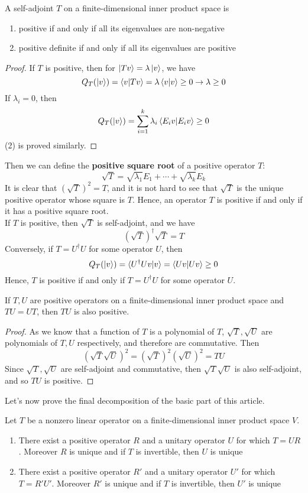 \documentclass{article}
\begin{document}
\begin{thm}
	A self-adjoint $T$ on a finite-dimensional inner product space is
	\begin{enumerate}
		\item positive if and only if all its eigenvalues are non-negative
		\item positive definite if and only if all its eigenvalues are positive
	\end{enumerate}
\end{thm}
\begin{proof}
	If $T$ is positive, then for $\ket{Tv}=\lambda\ket{v}$, we have
	\[Q_T(\ket{v})=\braket{v|Tv}=\lambda\braket{v|v}\ge0\rightarrow\lambda\ge0\]
	If $\lambda_i=0$, then
	\[Q_T(\ket{v})=\sum_{i=1}^k\lambda_i\braket{E_iv|E_iv}\ge0\]
	(2) is proved similarly.
\end{proof}
Then we can define the \textbf{positive square root} of a positive operator $T$:
\[\sqrt{T}=\sqrt{\lambda_1}E_1+\cdots+\sqrt{\lambda_k}E_k\]
It is clear that $(\sqrt{T})^2=T$, and it is not hard to see that $\sqrt{T}$ is the unique positive operator whose square is $T$. Hence, an operator $T$ is positive if and only if it has a positive square root.\\
\indent If $T$ is positive, then $\sqrt{T}$ is self-adjoint, and we have
\[(\sqrt{T})^\dagger\sqrt{T}=T\]
Conversely, if $T=U^\dagger U$ for some operator $U$, then
\[Q_T(\ket{v})=\braket{U^\dagger Uv|v}=\braket{Uv|Uv}\ge0\]
Hence, $T$ is positive if and only if $T=U^\dagger U$ for some operator $U$.
\begin{thm}
	If $T,U$ are positive operators on a finite-dimensional inner product space and $TU=UT$, then $TU$ is also positive.
\end{thm}
\begin{proof}
	As we know that a function of $T$ is a polynomial of $T$, $\sqrt{T},\sqrt{U}$ are polynomials of $T,U$ respectively, and therefore are commutative. Then
	\[(\sqrt{T}\sqrt{U})^2=(\sqrt{T})^2(\sqrt{U})^2=TU\]
	Since $\sqrt{T},\sqrt{U}$ are self-adjoint and commutative, then $\sqrt{T}\sqrt{U}$ is also self-adjoint, and so $TU$ is positive.
\end{proof}
Let's now prove the final decomposition of the basic part of this article.
\begin{thm}
	Let $T$ be a nonzero linear operator on a finite-dimensional inner product space $V$.
	\begin{enumerate}
		\item There exist a positive operator $R$ and a unitary operator $U$ for which $T=UR$. Moreover $R$ is unique and if $T$ is invertible, then $U$ is unique
		\item There exist a positive operator $R'$ and a unitary operator $U'$ for which $T=R'U'$. Moreover $R'$ is unique and if $T$ is invertible, then $U'$ is unique
	\end{enumerate}
\end{thm}
\end{document}
